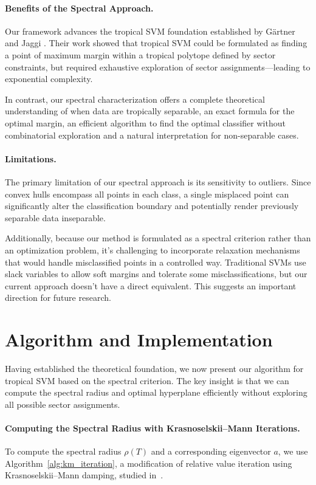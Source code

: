 \documentclass{article}
\begin{document}
\paragraph{Benefits of the Spectral Approach.} 
Our framework advances the tropical SVM foundation established by Gärtner and Jaggi \cite{gartner2008}. Their work showed that tropical SVM could be formulated as finding a point of maximum margin within a tropical polytope defined by sector constraints, but required exhaustive exploration of sector assignments—leading to exponential complexity.

In contrast, our spectral characterization offers a complete theoretical understanding of when data are tropically separable, an exact formula for the optimal margin, an efficient algorithm to find the optimal classifier without combinatorial exploration and a natural interpretation for non-separable cases.

\paragraph{Limitations.} 
The primary limitation of our spectral approach is its sensitivity to outliers. Since convex hulls encompass all points in each class, a single misplaced point can significantly alter the classification boundary and potentially render previously separable data inseparable.

Additionally, because our method is formulated as a spectral criterion rather than an optimization problem, it's challenging to incorporate relaxation mechanisms that would handle misclassified points in a controlled way. Traditional SVMs use slack variables to allow soft margins and tolerate some misclassifications, but our current approach doesn't have a direct equivalent. This suggests an important direction for future research.

\section{Algorithm and Implementation}\label{sec:algorithm}

Having established the theoretical foundation, we now present our algorithm for tropical SVM based on the spectral criterion. The key insight is that we can compute the spectral radius and optimal hyperplane efficiently without exploring all possible sector assignments.


\paragraph{Computing the Spectral Radius with Krasnoselskii--Mann Iterations.}
\label{subsec:spectral_computation}
To compute the spectral radius $\rho(T)$ and a corresponding eigenvector $a$, we use
Algorithm~\ref{alg:km_iteration}, a modification of relative value
iteration using Krasnoselskii--Mann damping, studied
in~\cite{akianmfcs}.
\end{document}
